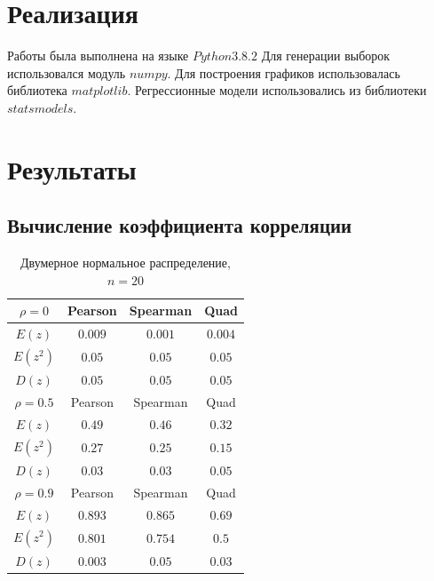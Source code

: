 \documentclass[a4]{article}
\begin{document}
\section{Реализация}
Работы была выполнена на языке $Python 3.8.2$
Для генерации выборок использовался модуль $numpy$.
Для построения графиков использовалась библиотека $matplotlib$.
Регрессионные модели использовались из библиотеки $statsmodels$.

\section{Результаты}
\subsection{Вычисление коэффициента корреляции}
\begin{table}[H]
	\caption{Двумерное нормальное распределение, $n=20$}
	\label{tab:my_label3}
	\begin{center}
		\vspace{5mm}
		\begin{tabular}{|c|c|c|c|}
			\hline
			$ \rho=0 $ & Pearson & Spearman & Quad\\
			\hline
			$ E(z) $ & $ 0.009 $ & $ 0.001 $ & $ 0.004 $\\
			\hline
			$ E(z^{2}) $ & $ 0.05 $ & $ 0.05 $ & $ 0.05 $\\
			\hline
			$ D(z) $  & $ 0.05 $ & $ 0.05 $ & $ 0.05 $\\
			\hline
			$ \rho=0.5 $ & Pearson & Spearman & Quad\\
			\hline
			$ E(z) $ & $ 0.49 $ & $ 0.46 $ & $ 0.32 $\\
			\hline
			$ E(z^{2}) $ & $ 0.27 $ & $ 0.25 $ & $ 0.15 $\\
			\hline
			$ D(z) $  & $ 0.03 $ & $ 0.03 $ & $ 0.05 $ \\
			\hline
			$ \rho=0.9 $ & Pearson & Spearman & Quad\\
			\hline
			$ E(z) $ & $ 0.893 $ & $ 0.865 $ & $ 0.69 $\\
			\hline
			$ E(z^{2}) $ & $ 0.801 $ & $ 0.754 $ & $ 0.5 $\\
			\hline
			$ D(z) $  & $ 0.003 $ & $ 0.05 $ & $ 0.03 $ \\
			\hline
		\end{tabular}
	\end{center}
\end{table}
\end{document}
